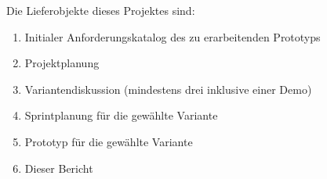 Die Lieferobjekte dieses Projektes sind:

\begin{enumerate}
  \item Initialer Anforderungskatalog des zu erarbeitenden Prototyps
  \item Projektplanung
  \item Variantendiskussion (mindestens drei inklusive einer Demo)
  \item Sprintplanung für die gewählte Variante
  \item Prototyp für die gewählte Variante
  \item Dieser Bericht
\end{enumerate}
